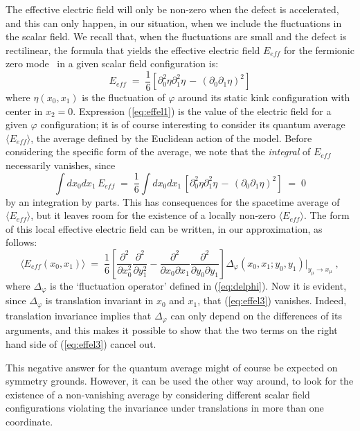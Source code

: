\documentclass[a4paper,12pt]{article}
\begin{document}
The effective electric field will only be non-zero when the defect is
accelerated, and this can only happen, in our situation, when we
include the fluctuations in the scalar field. We recall that, when the
fluctuations are small and the defect is rectilinear, the formula that
yields the effective electric field $E_{eff}$ for the fermionic zero
mode~\cite{ffl} in a given scalar field configuration is:
\begin{equation}\label{eq:effel1}
E_{eff} \;=\; \frac{1}{6} \left[\partial_0^2\eta \partial_1^2 \eta \,-\, (\partial_0\partial_1 \eta )^2 \right]
\end{equation}
where $\eta(x_0,x_1)$ is the fluctuation of $\varphi$ around its static kink
configuration with center in $x_2=0$. Expression (\ref{eq:effel1}) is
the value of the electric field for a given $\varphi$ configuration; it is
of course interesting to consider its quantum average $\langle E_{eff}\rangle$, the
average defined by the Euclidean action of the model. Before
considering the specific form of the average, we note that the 
{\em integral\/} of $E_{eff}$ necessarily vanishes, since
\begin{equation}\label{eq:effel2}
\int dx_0 dx_1 \, E_{eff} \;=\; \frac{1}{6} \int dx_0 dx_1 \, \left[\partial_0^2\eta \partial_1^2 \eta \,-\,
(\partial_0\partial_1 \eta )^2 \right]\;=\; 0
\end{equation}
by an integration by parts. This has consequences for the spacetime
average of $\langle E_{eff}\rangle$, but it leaves room for the existence of a
locally non-zero $\langle E_{eff}\rangle$.  The form of this local effective
electric field can be written, in our approximation, as follows:
\begin{equation}\label{eq:effel3}
\langle E_{eff}(x_0,x_1) \rangle  \;=\; \frac{1}{6} \left[
\frac{\partial^2}{\partial x_0^2}\frac{\partial^2}{\partial y_1^2} -
\frac{\partial^2}{\partial x_0 \partial x_1} \frac{\partial^2}{\partial y_0 \partial y_1}
\right] \Delta_\varphi(x_0,x_1;y_0, y_1)|_{y_\mu \to x_\mu} \;,
\end{equation}
where $\Delta_\varphi$ is the `fluctuation operator' defined in (\ref{eq:delphi}).
Now it is evident, since $\Delta_\varphi$ is translation invariant in $x_0$ and
$x_1$, that (\ref{eq:effel3}) vanishes. Indeed, translation invariance
implies that $\Delta_\varphi$ can only depend on the differences of its
arguments, and this makes it possible to show that the two terms on
the right hand side of  (\ref{eq:effel3}) cancel out.

This negative answer for the quantum average might of course be
expected on symmetry grounds. However, it can be used the other way
around, to look for the existence of a non-vanishing average by
considering different scalar field configurations
violating the invariance under translations in more than one coordinate.
\end{document}

